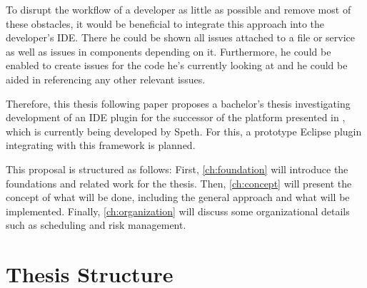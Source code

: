 To disrupt the workflow of a developer as little as possible and remove most of these obstacles, it would be beneficial to integrate this approach into the developer's \ac{IDE}. There he could be shown all issues attached to a file or service as well as issues in components depending on it. Furthermore, he could be enabled to create issues for the code he's currently looking at and he could be aided in referencing any other relevant issues. 

Therefore, this thesis following paper proposes a bachelor's thesis investigating development of an \ac{IDE} plugin for the successor of the  platform presented in \cite{Speth2019}, which is currently being developed by Speth. For this, a prototype Eclipse plugin integrating with this framework is planned.

This proposal is structured as follows: First, \autoref{ch:foundation} will introduce the foundations and related work for the thesis. Then, \autoref{ch:concept} will present the concept of what will be done, including the general approach and what will be implemented. Finally, \autoref{ch:organization} will discuss some organizational details such as scheduling and risk management.

\section*{Thesis Structure}

